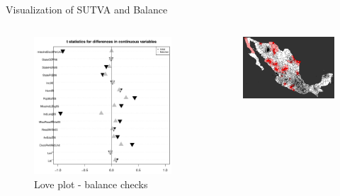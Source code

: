 \documentclass[final]{beamer}
\newlength{\onecolwid}
\newlength{\twocolwid}
\begin{document}
\begin{frame}[t]
\begin{columns}[t]
\begin{column}{\twocolwid}
\begin{block}{ Visualization of SUTVA and Balance}
        \begin{columns}[t,totalwidth=\twocolwid]
          \begin{column}{\onecolwid}
            \begin{figure}[htdp]
              \includegraphics[scale=1]{../Images/FinalLoveplot.pdf}
              \caption*{Love plot - balance checks}
            \end{figure}
          \end{column}
   			\begin{column}{\onecolwid}
             \begin{figure}[htdp]
 	              \includegraphics[scale=0.95]{intervened.png}

\end{figure}
\end{column}
\end{columns}
\end{block}
\end{column}
\end{columns}
\end{frame}
\end{document}
